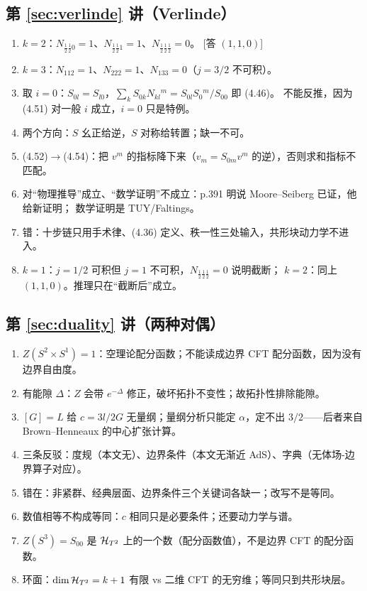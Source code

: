 \subsection*{第 \ref{sec:verlinde} 讲（Verlinde）}
\begin{enumerate}[leftmargin=*]
  \item $k=2$：$N_{\frac12\frac12 0}=1$、$N_{\frac12\frac12 1}=1$、$N_{\frac12\frac12\frac12}=0$。
        \hfill[答 $(1,1,0)$]
  \item $k=3$：$N_{112}=1$、$N_{222}=1$、$N_{133}=0$（$j=3/2$ 不可积）。
  \item 取 $i=0$：$S_{0l}=S_{l0}$，$\sum_k S_{0k}N_{kl}{}^m=S_{0l}S_{0}{}^m/S_{00}$ 即 (4.46)。
        不能反推，因为 (4.51) 对一般 $i$ 成立，$i=0$ 只是特例。
  \item 两个方向：$S$ 幺正给逆，$S$ 对称给转置；缺一不可。
  \item (4.52)$\to$(4.54)：把 $v^m$ 的指标降下来（$v_m=S_{0m}v^m$ 的逆），否则求和指标不匹配。
  \item 对“物理推导”成立、“数学证明”不成立：p.391 明说 Moore--Seiberg 已证，他给新证明；
        数学证明是 TUY/Faltings。
  \item 错：十步链只用手术律、(4.36) 定义、秩一性三处输入，共形块动力学不进入。
  \item $k=1$：$j=1/2$ 可积但 $j=1$ 不可积，$N_{\frac12\frac12\frac12}=0$ 说明截断；
        $k=2$：同上 $(1,1,0)$。推理只在“截断后”成立。
\end{enumerate}

\subsection*{第 \ref{sec:duality} 讲（两种对偶）}
\begin{enumerate}[leftmargin=*]
  \item $Z(S^2\times S^1)=1$：空理论配分函数；不能读成边界 CFT 配分函数，因为没有边界自由度。
  \item 有能隙 $\Delta$：$Z$ 会带 $e^{-\Delta}$ 修正，破坏拓扑不变性；故拓扑性排除能隙。
  \item $[G]=L$ 给 $c=3l/2G$ 无量纲；量纲分析只能定 $\alpha$，定不出 $3/2$——后者来自 Brown--Henneaux 的中心扩张计算。
  \item 三条反驳：度规（本文无）、边界条件（本文无渐近 AdS）、字典（无体场-边界算子对应）。
  \item 错在：非紧群、经典层面、边界条件三个关键词各缺一；改写不是等同。
  \item 数值相等不构成等同：$c$ 相同只是必要条件；还要动力学与谱。
  \item $Z(S^3)=S_{00}$ 是 $\mathcal{H}_{T^2}$ 上的一个数（配分函数值），不是边界 CFT 的配分函数。
  \item 环面：$\dim\mathcal{H}_{T^2}=k+1$ 有限 vs 二维 CFT 的无穷维；等同只到共形块层。
\end{enumerate}

